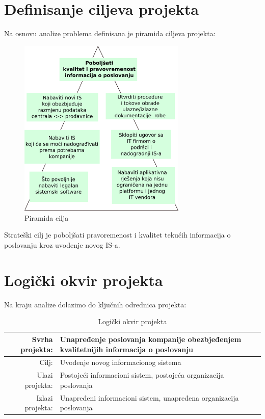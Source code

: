 \documentclass[times, utf8, seminar]{fit}
\begin{document}
\pagebreak
\section{Definisanje ciljeva projekta}
Na osnovu analize problema definisana je piramida ciljeva projekta: 

\begin{figure}[H]
\centering
\includegraphics[width=8cm]{img/piramida_cilja.png}
\caption{Piramida cilja}
\end{figure}

Strateški cilj je poboljšati pravoremenost i kvalitet tekućih informacija o poslovanju kroz uvođenje novog IS-a. 

\section{Logički okvir projekta}
Na kraju analize dolazimo do ključnih odrednica projekta:
\begin{table}[h]
\resizebox{15cm}{!} {
\begin{tabular}{ | r | l | }
\hline
Svrha projekta: & Unapređenje poslovanja kompanije obezbjeđenjem kvalitetnijih informacija o poslovanju \\ \hline
Cilj: & Uvođenje novog informacionog sistema \\ \hline
Ulazi projekta: & Postojeći informacioni sistem, postojeća organizacija poslovanja \\ \hline
Izlazi projekta: & Unapređeni informacioni sistem, unapređena organizacija poslovanja \\ \hline
\end{tabular}
}

\caption{Logički okvir projekta}
\end{table}
\end{document}
